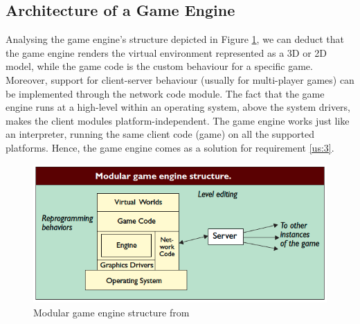 \subsection{Architecture of a Game Engine}\label{subsec:game_engine_architecture}
Analysing the game engine's structure depicted in Figure \ref{fig:game_engine_structure}, we can deduct that the game engine renders the virtual environment represented as a 3D or 2D model, while the game code is the custom behaviour for a specific game. Moreover, support for client-server behaviour (usually for multi-player games) can be implemented through the network code module. The fact that the game engine runs at a high-level within an operating system, above the system drivers, makes the client modules platform-independent. The game engine works just like an interpreter, running the same client code (game) on all the supported platforms. Hence, the game engine comes as a solution for requirement \ref{us:3}.\\
\begin{figure}[H]
	\centering
	\includegraphics[width=\linewidth]{gfx/Chapter3/game_engine_structure}
	\caption{Modular game engine structure from \cite{lewis2002game}}
	\label{fig:game_engine_structure}
\end{figure}

